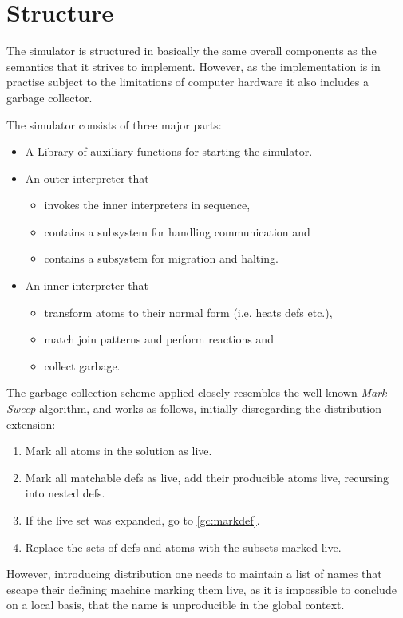 \section{Structure}

The simulator is structured in basically the same overall components as the
semantics that it strives to implement. However, as the implementation is in
practise subject to the limitations of computer hardware it also includes a
garbage collector.

The simulator consists of three major parts:
\begin{itemize}
\item A Library of auxiliary functions for starting the simulator.
\item An outer interpreter that
      \begin{itemize}
      \item invokes the inner interpreters in sequence,
      \item contains a subsystem for handling communication and
      \item contains a subsystem for migration and halting.
      \end{itemize}
\item An inner interpreter that
      \begin{itemize}
      \item transform atoms to their normal form (i.e. heats defs etc.),
      \item match join patterns and perform reactions and
      \item collect garbage.
      \end{itemize}
\end{itemize}

The garbage collection scheme applied closely resembles the well known
\emph{Mark-Sweep} algorithm, and works as follows, initially disregarding the
distribution extension:
\begin{enumerate}
\item Mark all atoms in the solution as live.
\item Mark all matchable defs as live, add their producible atoms live,
recursing into nested defs.\label{gc:markdef}
\item If the live set was expanded, go to \ref{gc:markdef}.
\item Replace the sets of defs and atoms with the subsets marked live.
\end{enumerate}

However, introducing distribution one needs to maintain a list of names that
escape their defining machine marking them live, as it is impossible to
conclude on a local basis, that the name is unproducible in the global context.

